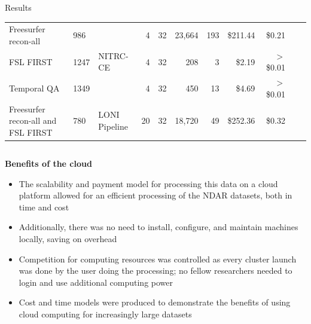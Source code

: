 \documentclass[final,hyperref={pdfpagelabels=false}]{beamer}
\begin{document}
\begin{frame}
\begin{columns}
\begin{column}{.5\textwidth}
{\begin{block}{Results}
\begin{center}
\begin{table}
\begin{tabularx}{\textwidth}{XXlrl*{6}{r}}
                        \hline
                        Freesurfer recon-all & 986 &  & 4 & 32 & 23,664 & 193 & \$211.44 & \$0.21\\
                        FSL FIRST & 1247 & NITRC-CE & 4 & 32 & 208 & 3 & \$2.19 & $>$ \$0.01\\
                        Temporal QA & 1349 &  & 4 & 32 & 450 & 13 & \$4.69 & $>$ \$0.01\\
                        \hline
                        Freesurfer recon-all and FSL FIRST & 780 & LONI Pipeline & 20 & 32 & 18,720 & 49 & \$252.36 & \$0.32\\
                    \end{tabularx}
                \end{table}
            \end{center}
          \begin{column}{.47\textwidth}
              {\bf Benefits of the cloud}
              \begin{itemize}
                  \item The scalability and payment model for processing this data on a cloud platform allowed for an efficient processing of the NDAR datasets, both in time and cost
                  \item Additionally, there was no need to install, configure, and maintain machines locally, saving on overhead
                  \item Competition for computing resources was controlled as every cluster launch was done by the user doing the processing; no fellow researchers needed to login and use additional computing power
                  \item Cost and time models were produced to demonstrate the benefits of using cloud computing for increasingly large datasets
              \end{itemize}

\end{column}
\end{block}}
\end{column}
\end{columns}
\end{frame}
\end{document}
